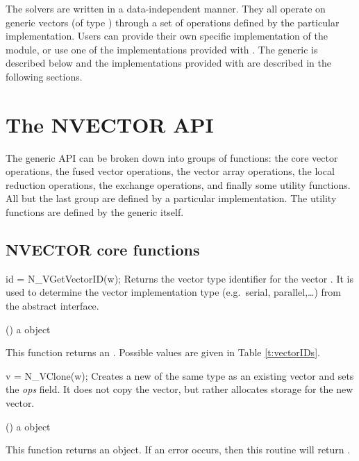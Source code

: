 %
The {\sundials} solvers are written in a data-independent manner.
They all operate on generic vectors (of type ) through a set of
operations defined by the particular {\nvector} implementation.
Users can provide their own specific implementation of the {\nvector}
module, or use one of the implementations provided with {\sundials}.
The generic {\nvector} is described below and the implementations
provided with {\sundials} are described in the following sections.

\section{The NVECTOR API}
\label{s:nvector_api}

The generic {\nvector} API can be broken down into groups of functions:
the core vector operations, the fused vector operations, the vector array
operations, the local reduction operations, the exchange operations, and
finally some utility functions. All but the last group are defined by a
particular {\nvector} implementation. The utility functions are defined
by the generic {\nvector} itself.

\subsection{NVECTOR core functions}\label{ss:nvecops}

{
  id = N\_VGetVectorID(w);
}
{
  Returns the vector type identifier for the vector . It is used to determine the
  vector implementation type (e.g.~serial, parallel,\ldots) from the abstract
   interface.
}
{
  \begin{args}[w]
  \item[w] () a {\nvector} object
  \end{args}
}
{
  This function returns an . Possible values are given in Table
  \ref{t:vectorIDs}.
}
{}

{
  v = N\_VClone(w);
}
{
  Creates a new  of the same type as an existing vector  and sets the
  {\em ops} field. It does not copy the vector, but rather allocates storage for the new vector.
}
{
  \begin{args}[w]
  \item[w] () a {\nvector} object
  \end{args}
}
{
  This function returns an  object. If an error occurs, then this
  routine will return .
}
{}

